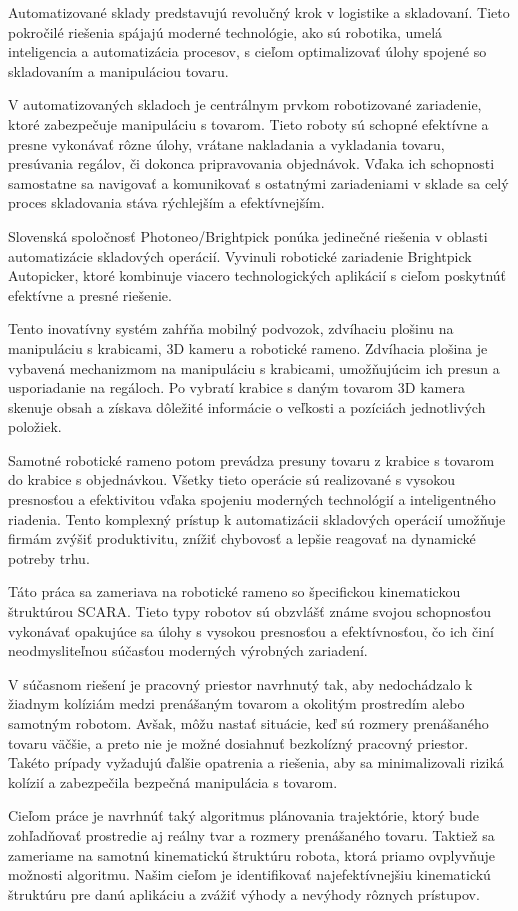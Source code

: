 

 Automatizované sklady predstavujú revolučný krok v logistike a skladovaní. Tieto pokročilé riešenia spájajú moderné technológie, ako sú robotika, umelá inteligencia a automatizácia procesov, s cieľom optimalizovať úlohy spojené so skladovaním a manipuláciou tovaru.
 
V automatizovaných skladoch je centrálnym prvkom robotizované zariadenie, ktoré zabezpečuje manipuláciu s tovarom. Tieto roboty sú schopné efektívne a presne vykonávať rôzne úlohy, vrátane nakladania a vykladania tovaru, presúvania regálov, či dokonca pripravovania objednávok. Vďaka ich schopnosti samostatne sa navigovať a komunikovať s ostatnými zariadeniami v sklade sa celý proces skladovania stáva rýchlejším a efektívnejším.
 

 Slovenská spoločnosť Photoneo/Brightpick ponúka jedinečné riešenia v oblasti automatizácie skladových operácií. Vyvinuli robotické zariadenie Brightpick Autopicker, ktoré kombinuje viacero technologických aplikácií s cieľom poskytnúť efektívne a presné riešenie.
 
 Tento inovatívny systém zahŕňa mobilný podvozok, zdvíhaciu plošinu na manipuláciu s krabicami, 3D kameru a robotické rameno. Zdvíhacia plošina je vybavená mechanizmom na manipuláciu s krabicami, umožňujúcim ich presun a usporiadanie na regáloch. Po vybratí krabice s daným tovarom 3D kamera skenuje obsah a získava dôležité informácie o veľkosti a pozíciách jednotlivých položiek.
 
 Samotné robotické rameno potom prevádza presuny tovaru z krabice s tovarom do krabice s objednávkou. Všetky tieto operácie sú realizované s vysokou presnosťou a efektivitou vďaka spojeniu moderných technológií a inteligentného riadenia.
 Tento komplexný prístup k automatizácii skladových operácií umožňuje firmám zvýšiť produktivitu, znížiť chybovosť a lepšie reagovať na dynamické potreby trhu.
 
Táto práca sa zameriava na robotické rameno so špecifickou kinematickou štruktúrou SCARA. Tieto typy robotov sú obzvlášť známe svojou schopnosťou vykonávať opakujúce sa úlohy s vysokou presnosťou a efektívnosťou, čo ich činí neodmysliteľnou súčasťou moderných výrobných zariadení.

V súčasnom riešení je pracovný priestor navrhnutý tak, aby nedochádzalo k žiadnym kolíziám medzi prenášaným tovarom a okolitým prostredím alebo samotným robotom. Avšak, môžu nastať situácie, keď sú rozmery prenášaného tovaru väčšie, a preto nie je možné dosiahnuť bezkolízný pracovný priestor. Takéto prípady vyžadujú ďalšie opatrenia a riešenia, aby sa minimalizovali riziká kolízií a zabezpečila bezpečná manipulácia s tovarom.

 Cieľom práce je navrhnúť taký algoritmus plánovania trajektórie, ktorý bude zohľadňovať prostredie aj reálny tvar a rozmery   prenášaného tovaru. Taktiež sa zameriame na samotnú kinematickú štruktúru robota, ktorá priamo ovplyvňuje možnosti algoritmu.
 Našim cieľom je identifikovať najefektívnejšiu kinematickú štruktúru pre danú aplikáciu a zvážiť výhody a nevýhody rôznych prístupov.  
 

 
 
 
 